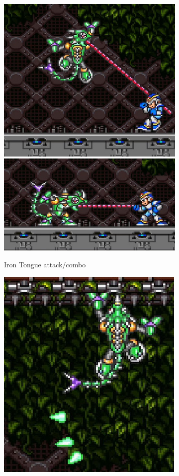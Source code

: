 \begin{figure}[htp]
	\centering
	\begin{subfigure}{\linewidth}
		\centering
		\includegraphics[width=0.4\linewidth]{figures/X1/Sting_chameleon/Chameleon_tongue_1.jpg}
		\includegraphics[width=0.5\linewidth]{figures/X1/Sting_chameleon/Chameleon_tongue_2.jpg}
		\caption{Iron Tongue attack/combo}
	\end{subfigure}
	\begin{subfigure}[t]{0.32\linewidth}
		\centering
		\includegraphics[width=\linewidth]{figures/X1/Sting_chameleon/Chameleon_sting.jpg}

\end{subfigure}
\end{figure}
